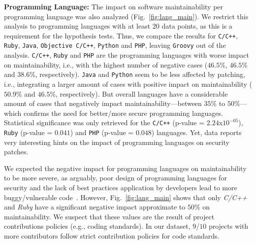 \documentclass[smallextended]{svjour3}       %
\begin{document}
\textbf{Programming Language:} The impact on software maintainability per programming 
language was also analyzed (Fig.~\ref{fig:lang_main}). We restrict 
this analysis to programming languages with at least $20$ data points, as this 
is a requirement for the hypothesis tests. Thus, we compare the results for 
\texttt{C/C++}, \texttt{Ruby}, \texttt{Java}, \texttt{Objective C/C++}, 
\texttt{Python} and \texttt{PHP}, leaving \texttt{Groovy} out of the analysis.
\texttt{C/C++}, \texttt{Ruby} and 
\texttt{PHP} are the programming languages with worse 
impact on maintainability, i.e., with the highest number of negative cases ($46.5\%$, $46.5\%$ and $38.6\%$, respectively). \texttt{Java} and \texttt{Python} 
seem to be less affected by patching, i.e., integrating a larger amount of cases with positive impact on maintainability ($50.9\%$ and $46.5\%$, respectively). But overall 
languages have a considerable amount of cases that negatively impact  
maintainability---between $35\%$ to $50\%$---which 
confirms the need for better/more secure programming languages. 
Statistical significance was only retrieved for the \texttt{C/C++} 
(p-value = $2.24$x$10^{-05}$), \texttt{Ruby} (p-value = $0.041$) and \texttt{PHP} 
(p-value = $0.048$) languages. Yet, data reports very interesting hints on the impact 
of programming languages on security patches.

We expected the negative impact for programming languages on
maintainability to be more severe, as arguably, poor design of programming
languages for security and the lack of best practices application by developers lead to more buggy/vulnerable
code~\cite{Ray:2017:LSP:3144574.3126905,2019arXiv190110220B}. However,
Fig.~\ref{fig:lang_main} shows that only \emph{C/C++} and \emph{Ruby} have 
a significant negative impact approximate to $50\%$ on 
maintainability. We suspect that these values are
the result of project contributions policies (e.g., coding standards). In our dataset, 
$9$/$10$ projects with more contributors follow strict contribution 
policies for code standards. %
\end{document}
